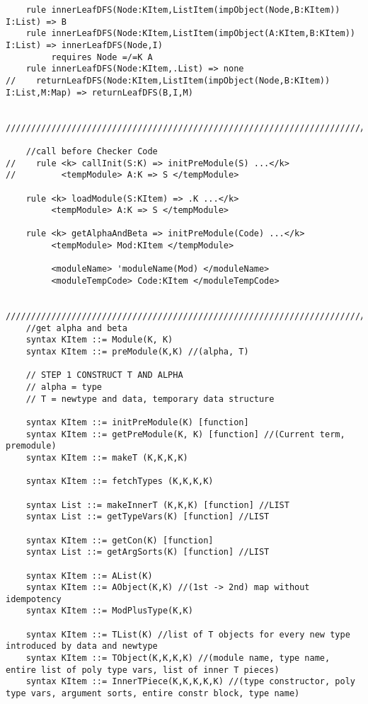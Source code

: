 \begin{lstlisting}
    rule innerLeafDFS(Node:KItem,ListItem(impObject(Node,B:KItem)) I:List) => B
    rule innerLeafDFS(Node:KItem,ListItem(impObject(A:KItem,B:KItem)) I:List) => innerLeafDFS(Node,I)
         requires Node =/=K A
    rule innerLeafDFS(Node:KItem,.List) => none
//    returnLeafDFS(Node:KItem,ListItem(impObject(Node,B:KItem)) I:List,M:Map) => returnLeafDFS(B,I,M)


////////////////////////////////////////////////////////////////////////////////////////////////////////////////////////

    //call before Checker Code
//    rule <k> callInit(S:K) => initPreModule(S) ...</k>
//         <tempModule> A:K => S </tempModule>

    rule <k> loadModule(S:KItem) => .K ...</k>
         <tempModule> A:K => S </tempModule>

    rule <k> getAlphaAndBeta => initPreModule(Code) ...</k>
         <tempModule> Mod:KItem </tempModule>

         <moduleName> 'moduleName(Mod) </moduleName>
         <moduleTempCode> Code:KItem </moduleTempCode>


////////////////////////////////////////////////////////////////////////////////////////////////////////////////////////
    //get alpha and beta
    syntax KItem ::= Module(K, K)
    syntax KItem ::= preModule(K,K) //(alpha, T)

    // STEP 1 CONSTRUCT T AND ALPHA
    // alpha = type
    // T = newtype and data, temporary data structure

    syntax KItem ::= initPreModule(K) [function]
    syntax KItem ::= getPreModule(K, K) [function] //(Current term, premodule)
    syntax KItem ::= makeT (K,K,K,K)

    syntax KItem ::= fetchTypes (K,K,K,K)

    syntax List ::= makeInnerT (K,K,K) [function] //LIST
    syntax List ::= getTypeVars(K) [function] //LIST

    syntax KItem ::= getCon(K) [function]
    syntax List ::= getArgSorts(K) [function] //LIST

    syntax KItem ::= AList(K)
    syntax KItem ::= AObject(K,K) //(1st -> 2nd) map without idempotency
    syntax KItem ::= ModPlusType(K,K)

    syntax KItem ::= TList(K) //list of T objects for every new type introduced by data and newtype
    syntax KItem ::= TObject(K,K,K,K) //(module name, type name, entire list of poly type vars, list of inner T pieces)
    syntax KItem ::= InnerTPiece(K,K,K,K,K) //(type constructor, poly type vars, argument sorts, entire constr block, type name)


\end{lstlisting}
